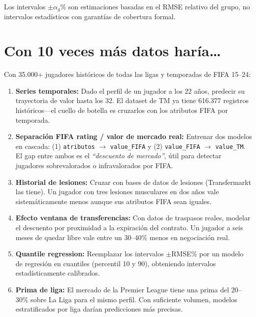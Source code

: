 \documentclass[12pt,a4paper]{report}
\begin{document}
Los intervalos $\pm\alpha_g\%$ son estimaciones basadas en el RMSE relativo del grupo, no intervalos estadísticos con garantías de cobertura formal.

\section{Con 10 veces más datos haría\ldots}

Con 35.000+ jugadores históricos de todas las ligas y temporadas de FIFA 15--24:

\begin{enumerate}
  \item \textbf{Series temporales:} Dado el perfil de un jugador a los 22 años, predecir su trayectoria de valor hasta los 32. El dataset de TM ya tiene 616.377 registros históricos---el cuello de botella es cruzarlos con los atributos FIFA por temporada.

  \item \textbf{Separación FIFA rating / valor de mercado real:} Entrenar dos modelos en cascada: (1) \texttt{atributos} $\to$ \texttt{value\_FIFA} y (2) \texttt{value\_FIFA} $\to$ \texttt{value\_TM}. El gap entre ambos es el \textit{``descuento de mercado''}, útil para detectar jugadores sobrevalorados o infravalorados por FIFA.

  \item \textbf{Historial de lesiones:} Cruzar con bases de datos de lesiones (Transfermarkt las tiene). Un jugador con tres lesiones musculares en dos años vale sistemáticamente menos aunque sus atributos FIFA sean iguales.

  \item \textbf{Efecto ventana de transferencias:} Con datos de traspasos reales, modelar el descuento por proximidad a la expiración del contrato. Un jugador a seis meses de quedar libre vale entre un 30--40\% menos en negociación real.

  \item \textbf{Quantile regression:} Reemplazar los intervalos $\pm$RMSE\% por un modelo de regresión en cuantiles (percentil 10 y 90), obteniendo intervalos estadísticamente calibrados.

  \item \textbf{Prima de liga:} El mercado de la Premier League tiene una prima del 20--30\% sobre La Liga para el mismo perfil. Con suficiente volumen, modelos estratificados por liga darían predicciones más precisas.
\end{enumerate}
\end{document}
